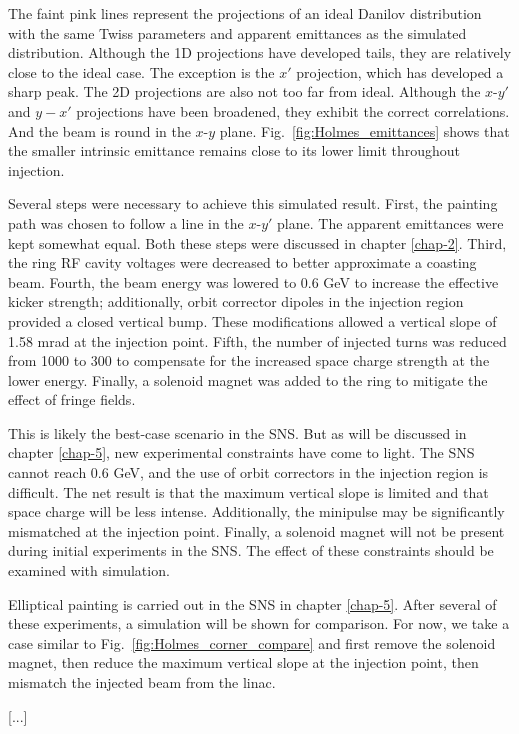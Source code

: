 %
The faint pink lines represent the projections of an ideal Danilov distribution with the same Twiss parameters and apparent emittances as the simulated distribution. Although the 1D projections have developed tails, they are relatively close to the ideal case. The exception is the $x'$ projection, which has developed a sharp peak. The 2D projections are also not too far from ideal. Although the $x$-$y'$ and $y-x'$ projections have been broadened, they exhibit the correct correlations. And the beam is round in the $x$-$y$ plane. Fig.~\ref{fig:Holmes_emittances} shows that the smaller intrinsic emittance remains close to its lower limit throughout injection. 

Several steps were necessary to achieve this simulated result. First, the painting path was chosen to follow a line in the $x$-$y'$ plane. The apparent emittances were kept somewhat equal. Both these steps were discussed in chapter \ref{chap-2}. Third, the ring RF cavity voltages were decreased to better approximate a coasting beam. Fourth, the beam energy was lowered to 0.6 GeV to increase the effective kicker strength; additionally, orbit corrector dipoles in the injection region provided a closed vertical bump. These modifications allowed a vertical slope of 1.58 mrad at the injection point. Fifth, the number of injected turns was reduced from 1000 to 300 to compensate for the increased space charge strength at the lower energy. Finally, a solenoid magnet was added to the ring to mitigate the effect of fringe fields. 

This is likely the best-case scenario in the SNS. But as will be discussed in chapter \ref{chap-5}, new experimental constraints have come to light. The SNS cannot reach 0.6 GeV, and the use of orbit correctors in the injection region is difficult. The net result is that the maximum vertical slope is limited and that space charge will be less intense. Additionally, the minipulse may be significantly mismatched at the injection point. Finally, a solenoid magnet will not be present during initial experiments in the SNS. The effect of these constraints should be examined with simulation.

Elliptical painting is carried out in the SNS in chapter \ref{chap-5}. After several of these experiments, a simulation will be shown for comparison. For now, we take a case similar to Fig.~\ref{fig:Holmes_corner_compare} and first remove the solenoid magnet, then reduce the maximum vertical slope at the injection point, then mismatch the injected beam from the linac. 

[...]